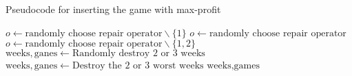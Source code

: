 \documentclass[12pt]{article}
\begin{document}
\begin{algorithm}
    \caption{Pseudocode for inserting the game with max-profit}
    \begin{algorithmic}[1] 
                \State $o\leftarrow \text{randomly choose repair operator}\backslash\{1\}$ 
            \Else
                \State $o\leftarrow \text{randomly choose repair operator}$ 
            \EndIf
                \State $o\leftarrow \text{randomly choose repair operator}\backslash\{1, 2\}$ 
            \EndIf
                \State $\text{weeks}, \text{ganes}\leftarrow \text{Randomly destroy 2 or 3 weeks}$
                \State $\text{weeks}, \text{ganes}\leftarrow \text{Destroy the 2 or 3 worst weeks}$
            \EndIf
            \Return $\text{weeks}, \text{games}$
        \EndFunction
    \end{algorithmic}
\end{algorithm}
\end{document}
